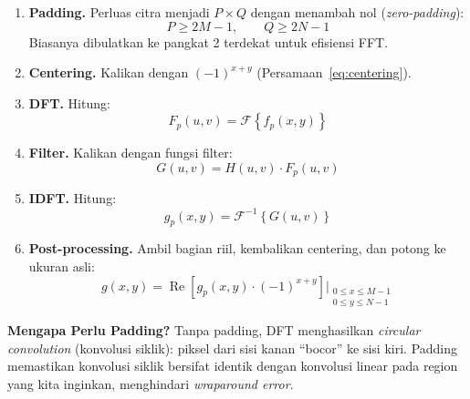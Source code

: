 \documentclass[12pt,a4paper]{article}
\begin{document}
\begin{enumerate}
  \item \textbf{Padding.} Perluas citra menjadi $P \times Q$ dengan menambah
        nol (\textit{zero-padding}):
        \begin{equation}
          P \geq 2M - 1, \qquad Q \geq 2N - 1
          \label{eq:padding_size}
        \end{equation}
        Biasanya dibulatkan ke pangkat 2 terdekat untuk efisiensi FFT.

  \item \textbf{Centering.} Kalikan dengan $(-1)^{x+y}$
        (Persamaan~\eqref{eq:centering}).

  \item \textbf{DFT.} Hitung:
        \begin{equation}
          F_p(u,v) = \mathcal{F}\!\left\{f_p(x,y)\right\}
          \label{eq:step_dft}
        \end{equation}

  \item \textbf{Filter.} Kalikan dengan fungsi filter:
        \begin{equation}
          G(u,v) = H(u,v) \cdot F_p(u,v)
          \label{eq:filtering_step}
        \end{equation}

  \item \textbf{IDFT.} Hitung:
        \begin{equation}
          g_p(x,y) = \mathcal{F}^{-1}\!\left\{G(u,v)\right\}
          \label{eq:step_idft}
        \end{equation}

  \item \textbf{Post-processing.} Ambil bagian riil, kembalikan centering,
        dan potong ke ukuran asli:
        \begin{equation}
          g(x,y) = \operatorname{Re}\!\left[g_p(x,y) \cdot (-1)^{x+y}\right]
                   \Big|_{\substack{0 \leq x \leq M-1 \\ 0 \leq y \leq N-1}}
          \label{eq:postprocess}
        \end{equation}
\end{enumerate}

\begin{notebox}
\textbf{Mengapa Perlu Padding?} Tanpa padding, DFT menghasilkan \textit{circular
convolution} (konvolusi siklik): piksel dari sisi kanan ``bocor'' ke sisi kiri.
Padding memastikan konvolusi siklik bersifat identik dengan konvolusi linear pada
region yang kita inginkan, menghindari \textit{wraparound error}.
\end{notebox}
\end{document}

